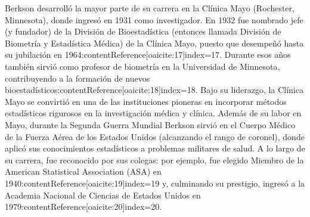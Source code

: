 \documentclass[12pt]{article}
\begin{document}
Berkson desarrolló la mayor parte de su carrera en la Clínica Mayo (Rochester, Minnesota), donde ingresó en 1931 como investigador. En 1932 fue nombrado jefe (y fundador) de la División de Bioestadística (entonces llamada División de Biometría y Estadística Médica) de la Clínica Mayo, puesto que desempeñó hasta su jubilación en 1964:contentReference[oaicite:17]{index=17}. Durante esos años también sirvió como profesor de biometría en la Universidad de Minnesota, contribuyendo a la formación de nuevos bioestadísticos:contentReference[oaicite:18]{index=18}. Bajo su liderazgo, la Clínica Mayo se convirtió en una de las instituciones pioneras en incorporar métodos estadísticos rigurosos en la investigación médica y clínica. Además de su labor en Mayo, durante la Segunda Guerra Mundial Berkson sirvió en el Cuerpo Médico de la Fuerza Aérea de los Estados Unidos (alcanzando el rango de coronel), donde aplicó sus conocimientos estadísticos a problemas militares de salud. A lo largo de su carrera, fue reconocido por sus colegas: por ejemplo, fue elegido Miembro de la American Statistical Association (ASA) en 1940:contentReference[oaicite:19]{index=19} y, culminando su prestigio, ingresó a la Academia Nacional de Ciencias de Estados Unidos en 1979:contentReference[oaicite:20]{index=20}.
\end{document}
